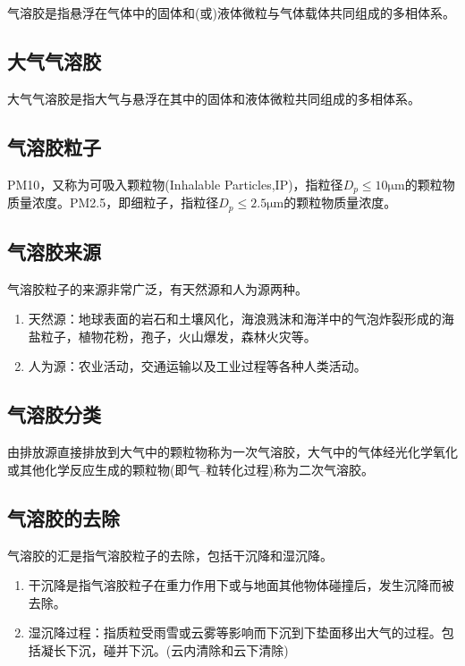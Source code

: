 \documentclass[UTF8,a4paper,11pt,oneside]{ctexbook}
\begin{document}
气溶胶是指悬浮在气体中的固体和(或)液体微粒与气体载体共同组成的多相体系。

\subsection{大气气溶胶}

大气气溶胶是指大气与悬浮在其中的固体和液体微粒共同组成的多相体系。

\subsection{气溶胶粒子}

PM10，又称为可吸入颗粒物(Inhalable Particles,IP)，指粒径\(D_p\leq10\mathrm{\mu{}m}\)的颗粒物质量浓度。PM2.5，即细粒子，指粒径\(D_p\leq{}2.5\mathrm{\mu{}m}\)的颗粒物质量浓度。

\subsection{气溶胶来源}

气溶胶粒子的来源非常广泛，有天然源和人为源两种。
\begin{enumerate}
    \item 天然源：地球表面的岩石和土壤风化，海浪溅沫和海洋中的气泡炸裂形成的海盐粒子，植物花粉，孢子，火山爆发，森林火灾等。
    \item 人为源：农业活动，交通运输以及工业过程等各种人类活动。
\end{enumerate}

\subsection{气溶胶分类}

由排放源直接排放到大气中的颗粒物称为一次气溶胶，大气中的气体经光化学氧化或其他化学反应生成的颗粒物(即气--粒转化过程)称为二次气溶胶。

\subsection{气溶胶的去除}

气溶胶的汇是指气溶胶粒子的去除，包括干沉降和湿沉降。
\begin{enumerate}
    \item 干沉降是指气溶胶粒子在重力作用下或与地面其他物体碰撞后，发生沉降而被去除。
    \item 湿沉降过程：指质粒受雨雪或云雾等影响而下沉到下垫面移出大气的过程。包括凝长下沉，碰并下沉。(云内清除和云下清除)
\end{enumerate}
\end{document}
